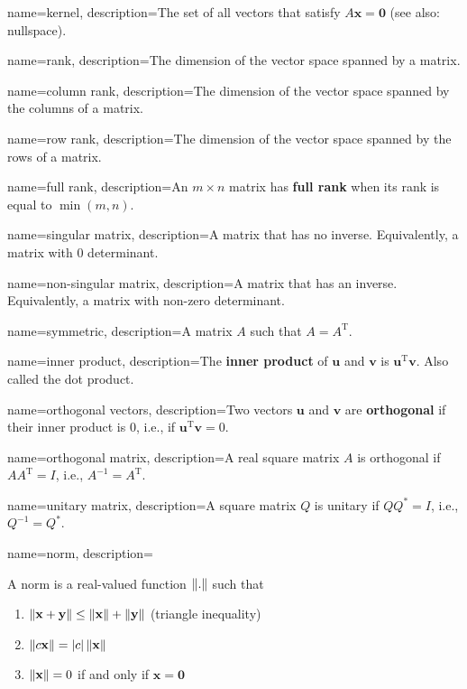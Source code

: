{
        name=kernel,
        description={The set of all vectors that satisfy \(A\mathbf{x}=\mathbf{0}\) (see also: nullspace).}
}

{
        name=rank,
        description={The dimension of the vector space spanned by a matrix.}
}

{
        name=column rank,
        description={The dimension of the vector space spanned by the columns of a matrix.}
}

{
        name=row rank,
        description={The dimension of the vector space spanned by the rows of a matrix.}
}

{
        name=full rank,
        description={An \(m\times n\) matrix has \textbf{full rank} when its rank is equal to \(\min\left(m, n\right)\).}
}

{
        name=singular matrix,
        description={A matrix that has no inverse. Equivalently, a matrix with 0 determinant.}
}

{
        name=non-singular matrix,
        description={A matrix that has an inverse. Equivalently, a matrix with non-zero determinant.}
}

{
        name=symmetric,
        description={A matrix \(A\) such that \(A=A^\text{T}\).}
}

{
        name=inner product,
        description={The \textbf{inner product} of \(\mathbf{u}\) and \(\mathbf{v}\) is \(\mathbf{u}^{\text{T}}\mathbf{v}\). Also called the dot product.}
}

{
        name=orthogonal vectors,
        description={Two vectors \(\mathbf{u}\) and \(\mathbf{v}\) are \textbf{orthogonal} if their inner product is 0, i.e., if \(\mathbf{u}^{\text{T}}\mathbf{v}=0\).}
}

{
        name=orthogonal matrix,
        description={A real square matrix \(A\) is orthogonal if \(AA^{\text{T}}=I\), i.e., \(A^{-1}=A^{\text{T}}\).}
}

{
        name=unitary matrix,
        description={A square matrix \(Q\) is unitary if \(QQ^*=I\), i.e., \(Q^{-1}=Q^*\).}
}

{
        name=norm,
        description={A norm is a real-valued function \(\left\lVert.\right\rVert\) such that
                        \begin{enumerate}
                                \item \(\left\lVert\mathbf{x} + \mathbf{y}\right\rVert \leq \left\lVert\mathbf{x}\right\rVert + \left\lVert\mathbf{y}\right\rVert\) (triangle inequality)
                                \item \(\left\lVert c\mathbf{x}\right\rVert=\left|c\right|\left\lVert\mathbf{x}\right\rVert\)
                                \item \(\left\lVert\mathbf{x}\right\rVert=0\) if and only if \(\mathbf{x}=\mathbf{0}\)
                        \end{enumerate}
                }
}

